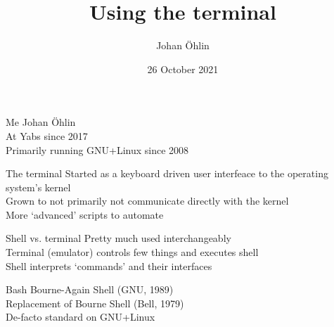\documentclass{beamer}
\title{Using the terminal}
\date{26 October 2021}
\author{Johan Öhlin}
\institute{Yabs}
\begin{document}
  \maketitle

  \begin{frame}{Me}
          Johan Öhlin           \\
          At Yabs since 2017    \\
          Primarily running GNU+Linux since 2008    \\
  \end{frame}
  \begin{frame}{The terminal}
          Started as a keyboard driven user interfeace to the operating system's
          kernel                                                            \\
          Grown to not primarily not communicate directly with the kernel   \\
          More `advanced' scripts to automate                               \\
  \end{frame}

  \begin{frame}{Shell vs. terminal}
          Pretty much used interchangeably                                  \\
          Terminal (emulator) controls few things and executes shell        \\
          Shell interprets `commands' and their interfaces                  \\
  \end{frame}
  
  \begin{frame}{Bash}
          Bourne-Again Shell (GNU, 1989)                                    \\
          Replacement of Bourne Shell (Bell, 1979)                          \\
          De-facto standard on GNU+Linux                                    \\
  \end{frame}
  
\end{document}
